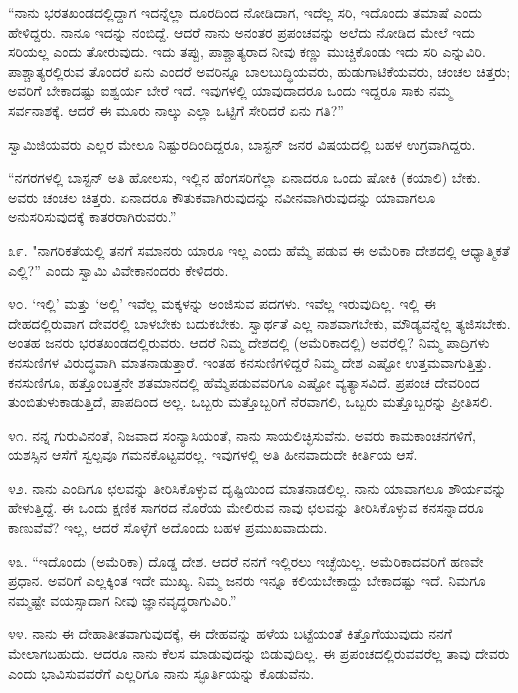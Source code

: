 “ನಾನು ಭರತಖಂಡದಲ್ಲಿದ್ದಾಗ ಇದನ್ನೆಲ್ಲಾ ದೂರದಿಂದ ನೋಡಿದಾಗ, ಇದೆಲ್ಲ ಸರಿ, ಇದೊಂದು ತಮಾಷೆ ಎಂದು ಹೇಳಿದ್ದರು. ನಾನೂ ಇದನ್ನು ನಂಬಿದ್ದೆ. ಆದರೆ ನಾನು ಅನಂತರ ಪ್ರಪಂಚವನ್ನು ಅಲೆದು ನೋಡಿದ ಮೇಲೆ ಇದು ಸರಿಯಲ್ಲ ಎಂದು ತೋರುವುದು. ಇದು ತಪ್ಪು, ಪಾಶ್ಚಾತ್ಯರಾದ ನೀವು ಕಣ್ಣು ಮುಚ್ಚಿಕೊಂಡು ಇದು ಸರಿ ಎನ್ನುವಿರಿ. ಪಾಶ್ಚಾತ್ಯರಲ್ಲಿರುವ ತೊಂದರೆ ಏನು ಎಂದರೆ ಅವರಿನ್ನೂ ಬಾಲಬುದ್ಧಿಯವರು, ಹುಡುಗಾಟಿಕೆಯವರು, ಚಂಚಲ ಚಿತ್ತರು; ಅವರಿಗೆ ಬೇಕಾದಷ್ಟು ಐಶ್ವರ್ಯ ಬೇರೆ ಇದೆ. ಇವುಗಳಲ್ಲಿ ಯಾವುದಾದರೂ ಒಂದು ಇದ್ದರೂ ಸಾಕು ನಮ್ಮ ಸರ್ವನಾಶಕ್ಕೆ. ಆದರೆ ಈ ಮೂರು ನಾಲ್ಕು ಎಲ್ಲಾ ಒಟ್ಟಿಗೆ ಸೇರಿದರೆ ಏನು ಗತಿ?”

ಸ್ವಾಮಿಜಿಯವರು ಎಲ್ಲರ ಮೇಲೂ ನಿಷ್ಟುರದಿಂದಿದ್ದರೂ, ಬಾಸ್ಟನ್ ಜನರ ವಿಷಯದಲ್ಲಿ ಬಹಳ ಉಗ್ರವಾಗಿದ್ದರು.

“ನಗರಗಳಲ್ಲಿ ಬಾಸ್ಟನ್ ಅತಿ ಹೋಲಸು, ಇಲ್ಲಿನ ಹೆಂಗಸರಿಗೆಲ್ಲಾ ಏನಾದರೂ ಒಂದು ಷೋಕಿ (ಕಯಾಲಿ) ಬೇಕು. ಅವರು ಚಂಚಲ ಚಿತ್ತರು. ಏನಾದರೂ ಕೌತುಕವಾಗಿರುವುದನ್ನು ನವೀನವಾಗಿರುವುದನ್ನು ಯಾವಾಗಲೂ ಅನುಸರಿಸುವುದಕ್ಕೆ ಕಾತರರಾಗಿರುವರು.”

೩೯. "ನಾಗರಿಕತೆಯಲ್ಲಿ ತನಗೆ ಸಮಾನರು ಯಾರೂ ಇಲ್ಲ ಎಂದು ಹೆಮ್ಮೆ ಪಡುವ ಈ ಅಮೆರಿಕಾ ದೇಶದಲ್ಲಿ ಆಧ್ಯಾತ್ಮಿಕತೆ ಎಲ್ಲಿ?” ಎಂದು ಸ್ವಾಮಿ ವಿವೇಕಾನಂದರು ಕೇಳಿದರು.

೪೦. ‘ಇಲ್ಲಿ’ ಮತ್ತು ‘ಅಲ್ಲಿ’ ಇವೆಲ್ಲ ಮಕ್ಕಳನ್ನು ಅಂಜಿಸುವ ಪದಗಳು. ಇವೆಲ್ಲ ಇರುವುದಿಲ್ಲ. ಇಲ್ಲಿ ಈ ದೇಹದಲ್ಲಿರುವಾಗ ದೇವರಲ್ಲಿ ಬಾಳಬೇಕು ಬದುಕಬೇಕು. ಸ್ವಾರ್ಥತೆ ಎಲ್ಲ ನಾಶವಾಗಬೇಕು, ಮೌಡ್ಯವನ್ನೆಲ್ಲ ತ್ಯಜಿಸಬೇಕು. ಅಂತಹ ಜನರು ಭರತಖಂಡದಲ್ಲಿರುವರು. ಆದರೆ ನಿಮ್ಮ ದೇಶದಲ್ಲಿ (ಅಮೆರಿಕಾದಲ್ಲಿ) ಅವರೆಲ್ಲಿ? ನಿಮ್ಮ ಪಾದ್ರಿಗಳು ಕನಸುಣಿಗಳ ವಿರುದ್ಧವಾಗಿ ಮಾತನಾಡುತ್ತಾರೆ. ಇಂತಹ ಕನಸುಣಿಗಳಿದ್ದರೆ ನಿಮ್ಮ ದೇಶ ಎಷ್ಟೋ ಉತ್ತಮವಾಗುತ್ತಿತ್ತು. ಕನಸುಣಿಗೂ, ಹತ್ತೊಂಬತ್ತನೇ ಶತಮಾನದಲ್ಲಿ ಹೆಮ್ಮೆಪಡುವವರಿಗೂ ಎಷ್ಟೋ ವ್ಯತ್ಯಾಸವಿದೆ. ಪ್ರಪಂಚ ದೇವರಿಂದ ತುಂಬಿತುಳುಕಾಡುತ್ತಿದೆ, ಪಾಪದಿಂದ ಅಲ್ಲ. ಒಬ್ಬರು ಮತ್ತೊಬ್ಬರಿಗೆ ನೆರವಾಗಲಿ, ಒಬ್ಬರು ಮತ್ತೊಬ್ಬರನ್ನು ಪ್ರೀತಿಸಲಿ.

೪೧. ನನ್ನ ಗುರುವಿನಂತೆ, ನಿಜವಾದ ಸಂನ್ಯಾಸಿಯಂತೆ, ನಾನು ಸಾಯಲಿಚ್ಛಿಸುವೆನು. ಅವರು ಕಾಮಕಾಂಚನಗಳಿಗೆ, ಯಶಸ್ಸಿನ ಆಸೆಗೆ ಸ್ವಲ್ಪವೂ ಗಮನಕೊಟ್ಟವರಲ್ಲ. ಇವುಗಳಲ್ಲಿ ಅತಿ ಹೀನವಾದುದೇ ಕೀರ್ತಿಯ ಆಸೆ.

೪೨. ನಾನು ಎಂದಿಗೂ ಛಲವನ್ನು ತೀರಿಸಿಕೊಳ್ಳುವ ದೃಷ್ಟಿಯಿಂದ ಮಾತನಾಡಲಿಲ್ಲ. ನಾನು ಯಾವಾಗಲೂ ಶೌರ್ಯವನ್ನು ಹೇಳುತ್ತಿದ್ದೆ. ಈ ಒಂದು ಕ್ಷಣಿಕ ಸಾಗರದ ನೊರೆಯ ಮೇಲಿರುವ ನಾವು ಛಲವನ್ನು ತೀರಿಸಿಕೊಳ್ಳುವ ಕನಸನ್ನಾದರೂ ಕಾಣುವೆವೆ? ಇಲ್ಲ, ಆದರೆ ಸೊಳ್ಳೆಗೆ ಅದೊಂದು ಬಹಳ ಪ್ರಮುಖವಾದುದು.

೪೩. “ಇದೊಂದು (ಅಮೆರಿಕಾ) ದೊಡ್ಡ ದೇಶ. ಆದರೆ ನನಗೆ ಇಲ್ಲಿರಲು ಇಚ್ಛೆಯಿಲ್ಲ. ಅಮೆರಿಕಾದವರಿಗೆ ಹಣವೇ ಪ್ರಧಾನ. ಅವರಿಗೆ ಎಲ್ಲಕ್ಕಿಂತ ಇದೇ ಮುಖ್ಯ. ನಿಮ್ಮ ಜನರು ಇನ್ನೂ ಕಲಿಯಬೇಕಾದ್ದು ಬೇಕಾದಷ್ಟು ಇದೆ. ನಿಮಗೂ ನಮ್ಮಷ್ಟೇ ವಯಸ್ಸಾದಾಗ ನೀವು ಜ್ಞಾನವೃದ್ಧರಾಗುವಿರಿ.”

೪೪. ನಾನು ಈ ದೇಹಾತೀತವಾಗುವುದಕ್ಕೆ, ಈ ದೇಹವನ್ನು ಹಳೆಯ ಬಟ್ಟೆಯಂತೆ ಕಿತ್ತೊಗೆಯುವುದು ನನಗೆ ಮೇಲಾಗಬಹುದು. ಆದರೂ ನಾನು ಕೆಲಸ ಮಾಡುವುದನ್ನು ಬಿಡುವುದಿಲ್ಲ. ಈ ಪ್ರಪಂಚದಲ್ಲಿರುವವರೆಲ್ಲ ತಾವು ದೇವರು ಎಂದು ಭಾವಿಸುವವರೆಗೆ ಎಲ್ಲರಿಗೂ ನಾನು ಸ್ಫೂರ್ತಿಯನ್ನು ಕೊಡುವೆನು.

